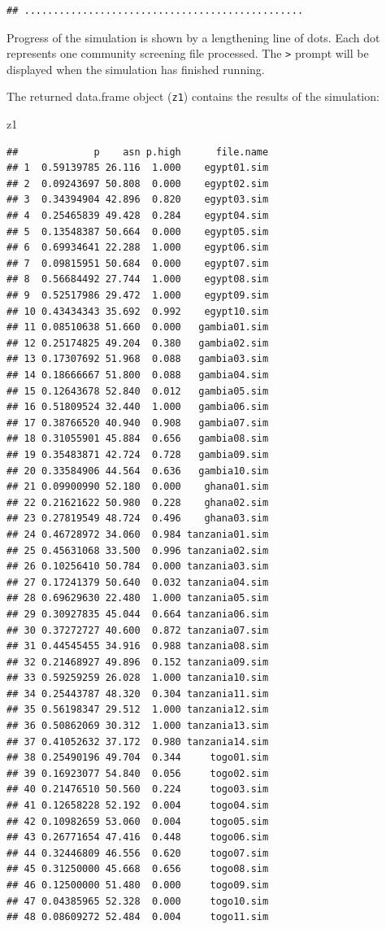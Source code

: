 \documentclass[12pt,a4paper]{book}
\newenvironment{Shaded}{\begin{snugshade}}{\end{snugshade}}
\newcommand{\NormalTok}[1]{#1}
\theoremstyle{definition}
\theoremstyle{definition}
\theoremstyle{definition}
\theoremstyle{remark}
\begin{document}
\begin{verbatim}
## ................................................
\end{verbatim}

Progress of the simulation is shown by a lengthening line of dots. Each
dot represents one community screening file processed. The
\texttt{\textgreater{}} prompt will be displayed when the simulation has
finished running.

The returned data.frame object (\texttt{z1}) contains the results of the
simulation:

\begin{Shaded}
\begin{Highlighting}[]
\NormalTok{z1}
\end{Highlighting}
\end{Shaded}

\begin{verbatim}
##             p    asn p.high      file.name
## 1  0.59139785 26.116  1.000    egypt01.sim
## 2  0.09243697 50.808  0.000    egypt02.sim
## 3  0.34394904 42.896  0.820    egypt03.sim
## 4  0.25465839 49.428  0.284    egypt04.sim
## 5  0.13548387 50.664  0.000    egypt05.sim
## 6  0.69934641 22.288  1.000    egypt06.sim
## 7  0.09815951 50.684  0.000    egypt07.sim
## 8  0.56684492 27.744  1.000    egypt08.sim
## 9  0.52517986 29.472  1.000    egypt09.sim
## 10 0.43434343 35.692  0.992    egypt10.sim
## 11 0.08510638 51.660  0.000   gambia01.sim
## 12 0.25174825 49.204  0.380   gambia02.sim
## 13 0.17307692 51.968  0.088   gambia03.sim
## 14 0.18666667 51.800  0.088   gambia04.sim
## 15 0.12643678 52.840  0.012   gambia05.sim
## 16 0.51809524 32.440  1.000   gambia06.sim
## 17 0.38766520 40.940  0.908   gambia07.sim
## 18 0.31055901 45.884  0.656   gambia08.sim
## 19 0.35483871 42.724  0.728   gambia09.sim
## 20 0.33584906 44.564  0.636   gambia10.sim
## 21 0.09900990 52.180  0.000    ghana01.sim
## 22 0.21621622 50.980  0.228    ghana02.sim
## 23 0.27819549 48.724  0.496    ghana03.sim
## 24 0.46728972 34.060  0.984 tanzania01.sim
## 25 0.45631068 33.500  0.996 tanzania02.sim
## 26 0.10256410 50.784  0.000 tanzania03.sim
## 27 0.17241379 50.640  0.032 tanzania04.sim
## 28 0.69629630 22.480  1.000 tanzania05.sim
## 29 0.30927835 45.044  0.664 tanzania06.sim
## 30 0.37272727 40.600  0.872 tanzania07.sim
## 31 0.44545455 34.916  0.988 tanzania08.sim
## 32 0.21468927 49.896  0.152 tanzania09.sim
## 33 0.59259259 26.028  1.000 tanzania10.sim
## 34 0.25443787 48.320  0.304 tanzania11.sim
## 35 0.56198347 29.512  1.000 tanzania12.sim
## 36 0.50862069 30.312  1.000 tanzania13.sim
## 37 0.41052632 37.172  0.980 tanzania14.sim
## 38 0.25490196 49.704  0.344     togo01.sim
## 39 0.16923077 54.840  0.056     togo02.sim
## 40 0.21476510 50.560  0.224     togo03.sim
## 41 0.12658228 52.192  0.004     togo04.sim
## 42 0.10982659 53.060  0.004     togo05.sim
## 43 0.26771654 47.416  0.448     togo06.sim
## 44 0.32446809 46.556  0.620     togo07.sim
## 45 0.31250000 45.668  0.656     togo08.sim
## 46 0.12500000 51.480  0.000     togo09.sim
## 47 0.04385965 52.328  0.000     togo10.sim
## 48 0.08609272 52.484  0.004     togo11.sim
\end{verbatim}
\end{document}
